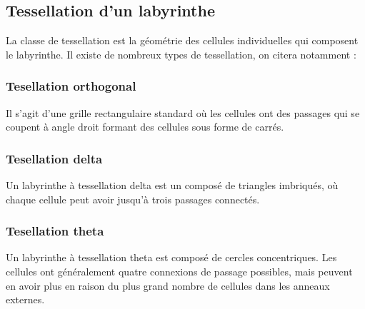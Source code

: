\subsection{Tessellation d'un labyrinthe}
La classe de tessellation est la géométrie des cellules individuelles qui composent le labyrinthe. Il existe de nombreux types de tessellation, on citera notamment :

\subsubsection{ Tesellation orthogonal}
Il s'agit d'une grille rectangulaire standard où les cellules ont des passages qui se coupent à angle droit formant des cellules sous forme de carrés.

\subsubsection{Tesellation delta} 
Un labyrinthe à tessellation delta est un composé de triangles imbriqués, où chaque cellule peut avoir jusqu'à trois passages connectés.

\subsubsection{Tesellation theta}
Un labyrinthe à tessellation theta est composé de cercles concentriques. Les cellules ont généralement quatre connexions de passage possibles, mais peuvent en avoir plus en raison du plus grand nombre de cellules dans les anneaux externes.


